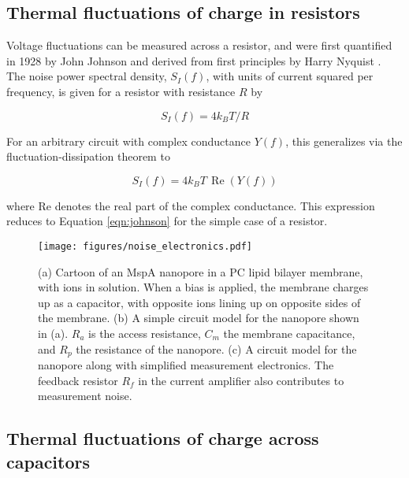 \subsection{Thermal fluctuations of charge in resistors}

Voltage fluctuations can be measured across a resistor, and were first quantified in 1928 by John Johnson \citep{Johnson1928} and derived from first principles by Harry Nyquist \citep{Nyquist1928}.  The noise power spectral density, $S_I (f)$, with units of current squared per frequency, is given for a resistor with resistance $R$ by

\begin{equation}
S_I(f) = 4 k_B T / R
\label{eqn:johnson}
\end{equation}

For an arbitrary circuit with complex conductance $Y(f)$, this generalizes via the fluctuation-dissipation theorem to \citep{Kogan1996, Hoogerheide2010, Sakmann1995}

\begin{equation}
S_I(f) = 4 k_B T \, \operatorname{Re}(Y(f))
\label{eqn:general}
\end{equation}

\noindent
where Re denotes the real part of the complex conductance.  This expression reduces to Equation \ref{eqn:johnson} for the simple case of a resistor.

\begin{figure}[h]
\begin{centering}
\texttt{[image: figures/noise\_electronics.pdf]}
\caption[Simple electrical model of the nanopore setup]{(a) Cartoon of an MspA nanopore in a PC lipid bilayer membrane, with ions in solution.  When a bias is applied, the membrane charges up as a capacitor, with opposite ions lining up on opposite sides of the membrane.  (b) A simple circuit model for the nanopore shown in (a).  $R_a$ is the access resistance, $C_m$ the membrane capacitance, and $R_p$ the resistance of the nanopore.  (c) A circuit model for the nanopore along with simplified measurement electronics.  The feedback resistor $R_f$ in the current amplifier also contributes to measurement noise.}
\label{fig:circuit_equiv}
\end{centering}
\end{figure}

\subsection{Thermal fluctuations of charge across capacitors}

